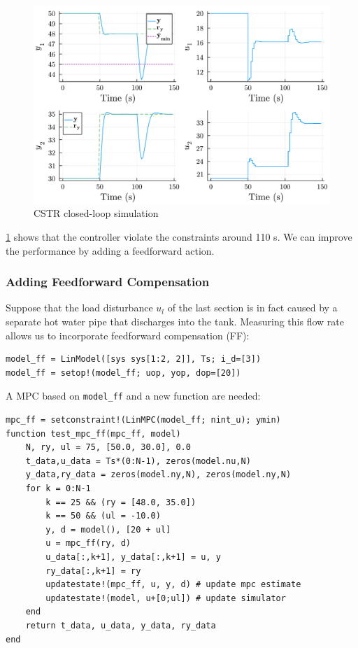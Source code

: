 \begin{figure}
    \centering
    \includegraphics[width=\columnwidth]{fig/plot1_LinMPC.pdf}
    \caption{CSTR closed-loop simulation}
    \label{fig:plot1_LinMPC}
\end{figure}

\cref{fig:plot1_LinMPC} shows that the controller violate the constraints around 110 s. We can improve the performance by adding a feedforward action.

\subsubsection{Adding Feedforward Compensation}

Suppose that the load disturbance $u_l$ of the last section is in fact caused by a separate hot water pipe that discharges into the tank. Measuring this flow rate allows us to incorporate feedforward compensation (FF):

\begin{verbatim}
model_ff = LinModel([sys sys[1:2, 2]], Ts; i_d=[3])
model_ff = setop!(model_ff; uop, yop, dop=[20])
\end{verbatim}

A MPC based on \texttt{model\_ff} and a new function are needed:

\begin{verbatim}
mpc_ff = setconstraint!(LinMPC(model_ff; nint_u); ymin)
function test_mpc_ff(mpc_ff, model)
    N, ry, ul = 75, [50.0, 30.0], 0.0
    t_data,u_data = Ts*(0:N-1), zeros(model.nu,N)
    y_data,ry_data = zeros(model.ny,N), zeros(model.ny,N)
    for k = 0:N-1
        k == 25 && (ry = [48.0, 35.0])
        k == 50 && (ul = -10.0)
        y, d = model(), [20 + ul]
        u = mpc_ff(ry, d)
        u_data[:,k+1], y_data[:,k+1] = u, y
        ry_data[:,k+1] = ry
        updatestate!(mpc_ff, u, y, d) # update mpc estimate
        updatestate!(model, u+[0;ul]) # update simulator
    end
    return t_data, u_data, y_data, ry_data
end
\end{verbatim}

